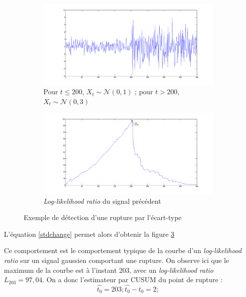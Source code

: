 \documentclass[french,11pt,notitlepage]{report}
\begin{document}
	
	\begin{figure}[h]

	\begin{subfigure}[t]{.49\textwidth}

  \includegraphics[width=\linewidth]{test_signal_std.png}
		\caption{Pour $t \leq 200$, $X_t \sim \mathcal{N}(0, 1)$ ; pour $t > 200$, $X_t \sim \mathcal{N}(0, 3)$}
		\label{test_signal_std}
	\end{subfigure}
	\hfill
	\begin{subfigure}[t]{.49\textwidth}

  \includegraphics[width=\linewidth]{llr_test_std.png}
		\caption{\textit{Log-likelihood ratio} du signal précédent}
		\label{llr_test_std}
	\end{subfigure}
	\caption{Exemple de détection d'une rupture par l'écart-type}
	\end{figure}
	

	
	L'équation \ref{stdchange} permet alors d'obtenir la figure \ref{llr_test_std}
		
	Ce comportement est le comportement typique de la courbe d'un \textit{log-likelihood ratio} sur un signal gaussien comportant une rupture. On observe ici que le maximum de la courbe est à l'instant 203, avec un \textit{log-likelihood ratio} $L_{203} = 97,04$. On a donc l'estimateur par CUSUM du point de rupture :
	\begin{equation*}
		\hat{t_0} = 203 ; \hat{t_0} - t_0 = 2;
	\end{equation*}
	
\end{document}
